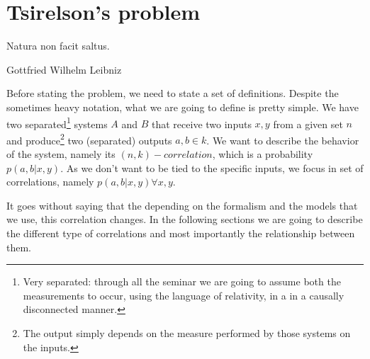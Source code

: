 \section{Tsirelson's problem}
\epigraph{Natura non facit saltus.}{Gottfried Wilhelm Leibniz}

Before stating the problem, we need to state a set of definitions. Despite the sometimes heavy notation, what we are going to define is pretty simple. We have two separated\footnote{Very separated: through all the seminar we are going to assume both the measurements to occur, using the language of relativity, in a in a causally disconnected manner.} systems $A$ and $B$ that receive two inputs $x,y$ from a given set $n$ and produce\footnote{The output simply depends on the measure performed by those systems on the inputs.} two (separated) outputs $a,b \in k$. We want to describe the behavior of the system, namely its $(n,k)-correlation$, which is a probability $p(a,b | x,y)$. As we don't want to be tied to the specific inputs, we focus in set of correlations, namely $p(a,b | x,y) \forall x, y$. 

It goes without saying that the depending on the formalism and the models that we use, this correlation changes. In the following sections we are going to describe the different type of correlations and most importantly the relationship between them.


